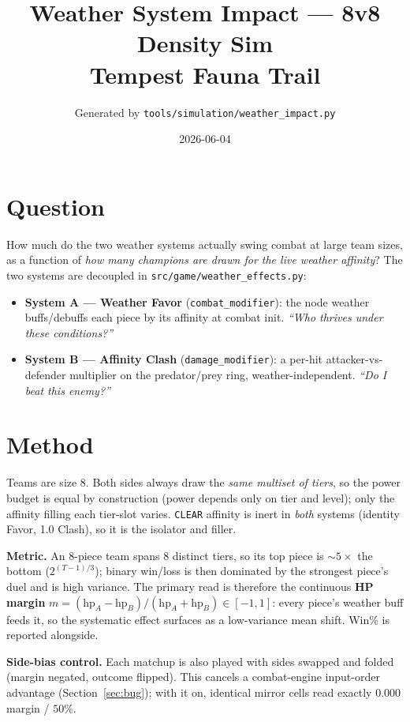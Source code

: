 \documentclass[11pt]{article}
\title{\textbf{Weather System Impact --- 8v8 Density Sim}\\[2pt]
\large Tempest Fauna Trail}
\author{Generated by \texttt{tools/simulation/weather\_impact.py}}
\date{2026-06-04}
\begin{document}
\maketitle

\section{Question}

How much do the two weather systems actually swing combat at large team sizes,
as a function of \emph{how many champions are drawn for the live weather affinity}?
The two systems are decoupled in \texttt{src/game/weather\_effects.py}:

\begin{itemize}
  \item \textbf{System A --- Weather Favor} (\texttt{combat\_modifier}): the node
  weather buffs/debuffs each piece by its affinity at combat init. \emph{``Who
  thrives under these conditions?''}
  \item \textbf{System B --- Affinity Clash} (\texttt{damage\_modifier}): a per-hit
  attacker-vs-defender multiplier on the predator/prey ring, weather-independent.
  \emph{``Do I beat this enemy?''}
\end{itemize}

\section{Method}

Teams are size 8. Both sides always draw the \emph{same multiset of tiers}, so the
power budget is equal by construction (power depends only on tier and level); only
the affinity filling each tier-slot varies. \texttt{CLEAR} affinity is inert in
\emph{both} systems (identity Favor, 1.0 Clash), so it is the isolator and filler.

\textbf{Metric.} An 8-piece team spans 8 distinct tiers, so its top piece is
$\sim5\times$ the bottom ($2^{(T-1)/3}$); binary win/loss is then dominated by the
strongest piece's duel and is high variance. The primary read is therefore the
continuous \textbf{HP margin} $m=(\mathrm{hp}_A-\mathrm{hp}_B)/(\mathrm{hp}_A+\mathrm{hp}_B)\in[-1,1]$:
every piece's weather buff feeds it, so the systematic effect surfaces as a
low-variance mean shift. Win\% is reported alongside.

\textbf{Side-bias control.} Each matchup is also played with sides swapped and
folded (margin negated, outcome flipped). This cancels a combat-engine input-order
advantage (Section~\ref{sec:bug}); with it on, identical mirror cells read exactly
$0.000$ margin / $50\%$.
\end{document}
